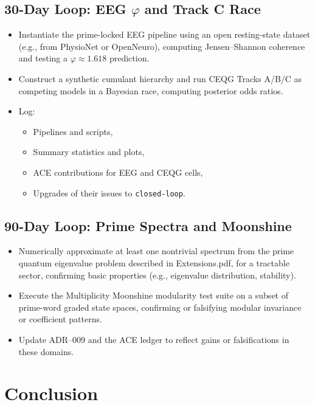 \documentclass[11pt]{article}
\begin{document}
\subsection{30-Day Loop: EEG \texorpdfstring{\(\varphi\)}{} and Track C Race}

\begin{itemize}[leftmargin=*]
  \item Instantiate the prime-locked EEG pipeline using an open resting-state dataset (e.g., from PhysioNet or OpenNeuro), computing Jensen--Shannon coherence and testing a \(\varphi \approx 1.618\) prediction.
  \item Construct a synthetic cumulant hierarchy and run CEQG Tracks A/B/C as competing models in a Bayesian race, computing posterior odds ratios.
  \item Log:
    \begin{itemize}
      \item Pipelines and scripts,
      \item Summary statistics and plots,
      \item ACE contributions for EEG and CEQG cells,
      \item Upgrades of their issues to \texttt{closed-loop}.
    \end{itemize}
\end{itemize}

\subsection{90-Day Loop: Prime Spectra and Moonshine}

\begin{itemize}[leftmargin=*]
  \item Numerically approximate at least one nontrivial spectrum from the prime quantum eigenvalue problem described in Extensions.pdf, for a tractable sector, confirming basic properties (e.g., eigenvalue distribution, stability).
  \item Execute the Multiplicity Moonshine modularity test suite on a subset of prime-word graded state spaces, confirming or falsifying modular invariance or coefficient patterns.
  \item Update ADR--009 and the ACE ledger to reflect gains or falsifications in these domains.
\end{itemize}

\newpage

\section{Conclusion}
\end{document}
